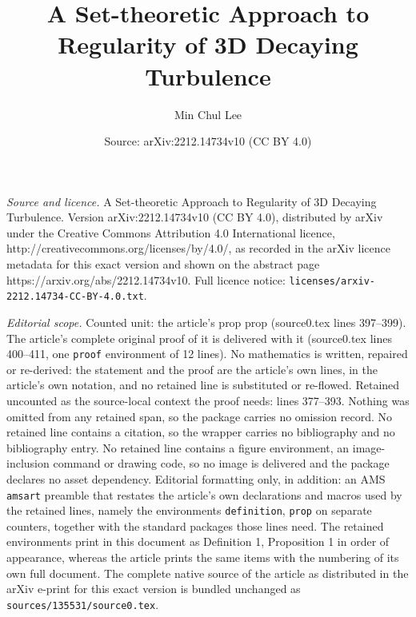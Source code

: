 \documentclass[10pt,a4paper]{amsart}
\title{A Set-theoretic Approach to Regularity of 3D Decaying Turbulence}
\author{Min Chul Lee}
\date{Source: arXiv:2212.14734v10 (CC BY 4.0)}
\begin{document}
\maketitle

\noindent\emph{Source and licence.} A Set-theoretic Approach to Regularity of 3D Decaying Turbulence. Version arXiv:2212.14734v10 (CC BY 4.0), distributed by arXiv under the Creative Commons Attribution 4.0 International licence, http://creativecommons.org/licenses/by/4.0/, as recorded in the arXiv licence metadata for this exact version and shown on the abstract page https://arxiv.org/abs/2212.14734v10. Full licence notice: \texttt{licenses/arxiv-2212.14734-CC-BY-4.0.txt}.\par\smallskip

\noindent\textit{Editorial scope.} Counted unit: the article's prop prop (source0.tex lines 397--399). The article's complete original proof of it is delivered with it (source0.tex lines 400--411, one \texttt{proof} environment of 12 lines). No mathematics is written, repaired or re-derived: the statement and the proof are the article's own lines, in the article's own notation, and no retained line is substituted or re-flowed.  Retained uncounted as the source-local context the proof needs: lines 377--393.  Nothing was omitted from any retained span, so the package carries no omission record.  No retained line contains a citation, so the wrapper carries no bibliography and no bibliography entry.  No retained line contains a figure environment, an image-inclusion command or drawing code, so no image is delivered and the package declares no asset dependency.  Editorial formatting only, in addition: an AMS \texttt{amsart} preamble that restates the article's own declarations and macros used by the retained lines, namely the environments \texttt{definition}, \texttt{prop} on separate counters, together with the standard packages those lines need.  The retained environments print in this document as Definition 1, Proposition 1 in order of appearance, whereas the article prints the same items with the numbering of its own full document.  The complete native source of the article as distributed in the arXiv e-print for this exact version is bundled unchanged as \texttt{sources/135531/source0.tex}.
\end{document}
